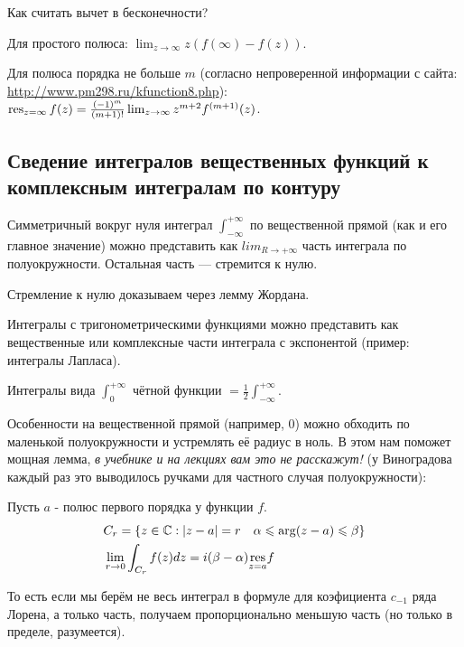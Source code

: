 \documentclass[12pt, a4paper]{article}
\begin{document}
Как считать вычет в бесконечности?

Для простого полюса: $\lim_{z → ∞} z (f(∞) - f(z))$.

Для полюса порядка не больше $m$ (согласно непроверенной информации с сайта: \url{http://www.pm298.ru/kfunction8.php}): $\operatorname{res}_{z=\infty} f(z)=\frac{(-1)^m}{(m+1) !} \lim _{z \rightarrow \infty} z^{m+2} f^{(m+1)}(z)$.


\subsection{Сведение интегралов вещественных функций к комплексным интегралам по контуру}

Симметричный вокруг нуля интеграл $\int_{-\infty}^{+\infty}$ по вещественной прямой (как и его главное значение) можно представить как $lim_{R → +\infty} $ часть интеграла по полуокружности. Остальная часть — стремится к нулю.

Стремление к нулю доказываем через лемму Жордана.

Интегралы с тригонометрическими функциями можно представить как вещественные или комплексные части интеграла с экспонентой (пример: интегралы Лапласа).

Интегралы вида $\int_0^{+\infty}$ чётной функции $= \frac{1}{2} \int_{-\infty}^{+\infty}$.

Особенности на вещественной прямой (например, $0$) можно обходить по маленькой полуокружности и устремлять её радиус в ноль. 
В этом нам поможет мощная лемма, \textit{в учебнике и на лекциях вам это не расскажут!} 
(у Виноградова каждый раз это выводилось ручками для частного случая полуокружности):

\begin{theorem}

  Пусть $a$ - полюс первого порядка у функции $f$.
  \begin{equation}
    \begin{aligned}
      & C_r=\{z \in \mathbb{C}:|z-a|=r \quad \alpha \leqslant \arg (z-a) \leqslant \beta\} \\
      & \lim _{r \rightarrow 0} \int_{C_r} f(z) d z=i(\beta-\alpha) \underset{z=a}{\operatorname{res}} f
    \end{aligned}    
  \end{equation}
\end{theorem}

То есть если мы берём не весь интеграл в формуле для коэфициента $c_{-1}$ ряда Лорена, 
а только часть, получаем пропорционально меньшую часть (но только в пределе, разумеется).
\end{document}

